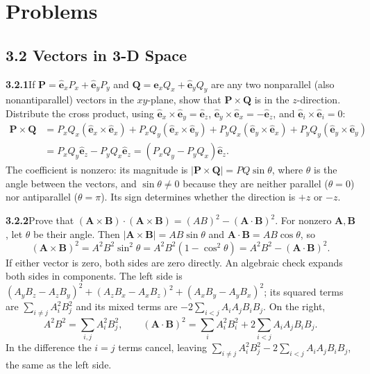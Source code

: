 
\section*{Problems}

\subsection*{3.2 Vectors in 3-D Space}

\par\bigskip
\noindent\textbf{3.2.1}\quad If $\mathbf{P}=\hat{\mathbf{e}}_{x}P_{x}
+\hat{\mathbf{e}}_{y}P_{y}$ and $\mathbf{Q}=\hat{\mathbf{e}}_{x}Q_{x}
+\hat{\mathbf{e}}_{y}Q_{y}$ are any two nonparallel (also nonantiparallel)
vectors in the $xy$-plane, show that $\mathbf{P}\times\mathbf{Q}$ is in the
$z$-direction.
\solution
Distribute the cross product, using
$\hat{\mathbf e}_x\times\hat{\mathbf e}_y=\hat{\mathbf e}_z$,
$\hat{\mathbf e}_y\times\hat{\mathbf e}_x=-\hat{\mathbf e}_z$, and
$\hat{\mathbf e}_i\times\hat{\mathbf e}_i=0$:
\[
\begin{aligned}
\mathbf P\times\mathbf Q
&=P_xQ_x(\hat{\mathbf e}_x\times\hat{\mathbf e}_x)
+P_xQ_y(\hat{\mathbf e}_x\times\hat{\mathbf e}_y)
+P_yQ_x(\hat{\mathbf e}_y\times\hat{\mathbf e}_x)
+P_yQ_y(\hat{\mathbf e}_y\times\hat{\mathbf e}_y)\\
&=P_xQ_y\hat{\mathbf e}_z-P_yQ_x\hat{\mathbf e}_z
=\boxed{(P_xQ_y-P_yQ_x)\hat{\mathbf e}_z}.
\end{aligned}
\]
The coefficient is nonzero: its magnitude is
$|\mathbf P\times\mathbf Q|=PQ\sin\theta$, where $\theta$ is the angle
between the vectors, and $\sin\theta\ne0$ because they are neither
parallel ($\theta=0$) nor antiparallel ($\theta=\pi$).
Its sign determines whether the direction is $+z$ or $-z$.

\par\bigskip
\noindent\textbf{3.2.2}\quad Prove that
$(\mathbf{A}\times\mathbf{B})\cdot(\mathbf{A}\times\mathbf{B})
=(AB)^{2}-(\mathbf{A}\cdot\mathbf{B})^{2}$.
\solution
For nonzero $\mathbf A,\mathbf B$, let $\theta$ be their angle.
Then $|\mathbf A\times\mathbf B|=AB\sin\theta$ and
$\mathbf A\cdot\mathbf B=AB\cos\theta$, so
\[
(\mathbf A\times\mathbf B)^2=A^2B^2\sin^2\theta
=A^2B^2(1-\cos^2\theta)
=\boxed{A^2B^2-(\mathbf A\cdot\mathbf B)^2}.
\]
If either vector is zero, both sides are zero directly.
An algebraic check expands both sides in components. The left side is
$(A_yB_z-A_zB_y)^2+(A_zB_x-A_xB_z)^2+(A_xB_y-A_yB_x)^2$;
its squared terms are $\sum_{i\ne j}A_i^2B_j^2$ and its mixed terms
are $-2\sum_{i<j}A_iA_jB_iB_j$. On the right,
\[
A^2B^2=\sum_{i,j}A_i^2B_j^2,\qquad
(\mathbf A\cdot\mathbf B)^2=\sum_iA_i^2B_i^2+2\sum_{i<j}A_iA_jB_iB_j .
\]
In the difference the $i=j$ terms cancel, leaving
$\sum_{i\ne j}A_i^2B_j^2-2\sum_{i<j}A_iA_jB_iB_j$, the same as the
left side.

